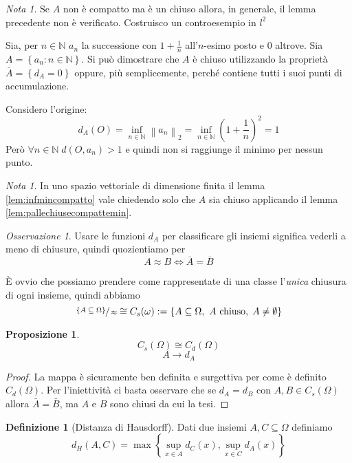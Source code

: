 \documentclass[a4paper,10pt]{article}
\newcounter{counter1}
\theoremstyle{plain}
\newtheorem{mypro}[counter1]{Proposizione}
\theoremstyle{definition}
\newtheorem{mydef}[counter1]{Definizione}
\theoremstyle{remark}
\newtheorem{mynot}[counter1]{Nota}
\newtheorem{myoss}[counter1]{Osservazione}
\newcommand{\set}[1]{\left\{#1\right\}}
\newcommand{\pa}[1]{\left(#1\right)}
\newcommand{\norm}[1]{\left\|#1\right\|}
\begin{document}
\begin{mynot}
  Se $A$ non è compatto ma è un chiuso allora, in generale, il lemma
  precedente non è verificato. Costruisco un controesempio in $l^2$
  
  Sia, per $n\in \mathbb{N}$ $a_n$ la successione con $1+\frac{1}{n}$
  all'$n$-esimo posto e $0$ altrove. Sia $A = \set{a_n : n\in
    \mathbb{N}}$. Si pu\`o dimostrare che $A$ \`e chiuso utilizzando
  la propriet\`a $\bar A = \set {d_A = 0}$ oppure, più semplicemente,
  perché contiene tutti i suoi punti di accumulazione.

  Considero l'origine:
  \[ d_A(O) = \inf _{n\in \mathbb{N}} \norm{a_n}_2 = \inf _{n\in
    \mathbb{N}} \pa{1+\frac{1}{n}}^2 = 1 \]
  Però $\forall n\in \mathbb{N}\; d(O,a_n) > 1$ e quindi non si
  raggiunge il minimo per nessun punto.  
\end{mynot}

\begin{mynot}
  In uno spazio vettoriale di dimensione finita il lemma
  \ref{lem:infmincompatto} vale chiedendo solo che $A$ sia chiuso
  applicando il lemma \ref{lem:pallechiusecompattemin}.
\end{mynot}


\begin{myoss}
  Usare le funzioni $d_A$ per classificare gli insiemi significa
  vederli a meno di chiusure, quindi quozientiamo per
  \[ A \approx B \Leftrightarrow \bar A = \bar B \] 

  È ovvio che possiamo prendere come rappresentate di una classe
  l'\textit{unica} chiusura di ogni insieme, quindi abbiamo
  \[ \sfrac{\set{A \subseteq \Omega}}{\approx} \cong C_s(\omega) := \set{A
    \subseteq \Omega,\ A\text{ chiuso},\; A\neq \emptyset} \]
\end{myoss}
\begin{mypro}
  \[ C_s(\Omega) \cong C_d(\Omega) \]
  \[ A \rightarrow d_A \]
\end{mypro}
\begin{proof}
  La mappa è sicuramente ben definita e surgettiva per come è definito
  $C_d(\Omega)$. Per l'iniettività ci basta osservare che se $d_A =
  d_B$ con $A,B \in C_s(\Omega)$ allora $\bar A = \bar B$, ma $A$ e $B$
  sono chiusi da cui la tesi.
\end{proof}



\begin{mydef}[Distanza di Hausdorff]
  Dati due insiemi $A,C \subseteq \Omega$ definiamo
%
  \[ d_H(A,C) = \max \set{\sup _{x\in A} d_C (x) , \sup _{x\in C} d_A
    (x) } \]
\end{mydef}
\end{document}
